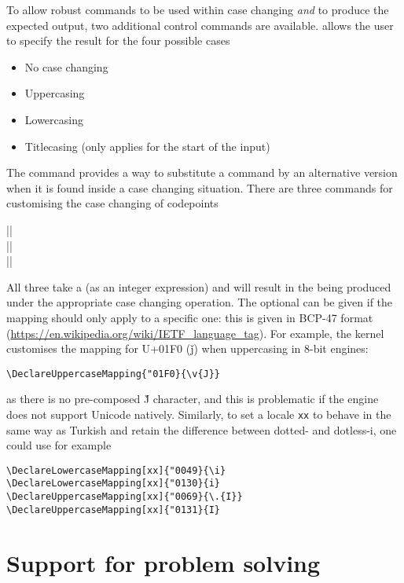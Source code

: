 \documentclass{ltxguide}
\begin{document}
To allow robust commands to be used within case changing \emph{and} to produce
the expected output, two additional control commands are available.
 allows the user to specify the result for the four possible
cases
\begin{itemize}
  \item No case changing
  \item Uppercasing
  \item Lowercasing
  \item Titlecasing (only applies for the start of the input)
\end{itemize}

The command  provides a way to substitute a
command by an alternative version when it is found inside a case changing
situation. There are three commands for customising the case changing of
codepoints
\begin{decl}
  |\DeclareLowercaseMapping|    \\
  |\DeclareTitlecaseMapping|    \\
  |\DeclareUppercaseMapping|   
\end{decl}
All three take a  (as an integer expression) and will
result in the  being produced under the appropriate case changing
operation. The optional  can be given if the mapping should only
apply to a specific one: this is given in BCP-47 format
(\url{https://en.wikipedia.org/wiki/IETF_language_tag}). For example,
the kernel customises the mapping for U+01F0 (\v{j}) when uppercasing in
8-bit engines:
\begin{verbatim}
\DeclareUppercaseMapping{"01F0}{\v{J}}
\end{verbatim}
as there is no pre-composed \v{J} character, and this is problematic if
the engine does not support Unicode natively. Similarly, to set a locale
\texttt{xx} to behave in the same way as Turkish and retain the difference
between dotted- and dotless-i, one could use for example
\begin{verbatim}
\DeclareLowercaseMapping[xx]{"0049}{\i}
\DeclareLowercaseMapping[xx]{"0130}{i}
\DeclareUppercaseMapping[xx]{"0069}{\.{I}}
\DeclareUppercaseMapping[xx]{"0131}{I}
\end{verbatim}

\section{Support for problem solving}
\end{document}
